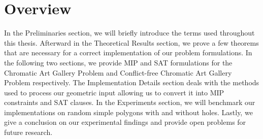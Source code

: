 
\section{Overview}
In the Preliminaries section, we will briefly introduce the terms used throughout this thesis. Afterward in the Theoretical Results section, we prove a few theorems that are necessary for a correct implementation of our problem formulations. In the following two sections, we provide MIP and SAT formulations for the Chromatic Art Gallery Problem and Conflict-free Chromatic Art Gallery Problem respectively. The Implementation Details section deals with the methods used to process our geometric input allowing us to convert it into MIP constraints and SAT clauses. In the Experiments section, we will benchmark our implementations on random simple polygons with and without holes. Lastly, we give a conclusion on our experimental findings and provide open problems for future research.